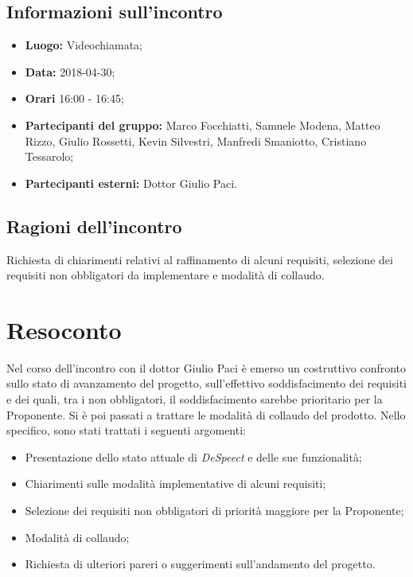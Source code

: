 \documentclass[openany,12pt,a4paper]{article}
\begin{document}
  \subsection{Informazioni sull'incontro} 
   
  \begin{itemize}  
      \item \textbf{Luogo:} Videochiamata;
      \item \textbf{Data:} 2018-04-30; 
      \item \textbf{Orari} 16:00 - 16:45;
      \item \textbf{Partecipanti del gruppo:} Marco Focchiatti, Samuele Modena, Matteo Rizzo, Giulio Rossetti, Kevin Silvestri, Manfredi Smaniotto, Cristiano Tessarolo; 
      \item \textbf{Partecipanti esterni:} Dottor Giulio Paci. 
  \end{itemize} 
 
  \subsection{Ragioni dell'incontro} 
  Richiesta di chiarimenti relativi al raffinamento di alcuni requisiti, selezione dei requisiti non obbligatori da implementare e modalità di collaudo. 
 
  \section{Resoconto} 
  Nel corso dell'incontro con il dottor Giulio Paci è emerso un costruttivo confronto sullo stato di avanzamento del progetto, sull'effettivo soddisfacimento dei requisiti e dei quali, tra i non obbligatori, il soddisfacimento sarebbe prioritario per la Proponente. Si è poi passati a trattare le modalità di collaudo del prodotto. Nello specifico, sono stati trattati i seguenti argomenti: 
  
  \begin{itemize}
  	\item Presentazione dello stato attuale di \textit{DeSpeect} e delle sue funzionalità;
    \item Chiarimenti sulle modalità implementative di alcuni requisiti;
    \item Selezione dei requisiti non obbligatori di priorità maggiore per la Proponente;
    \item Modalità di collaudo;
    \item Richiesta di ulteriori pareri o suggerimenti sull'andamento del progetto.
    
  \end{itemize}
  
\end{document}
